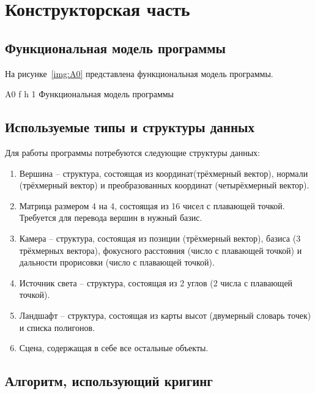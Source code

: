 \chapter{Конструкторская часть}

\section{Функциональная модель программы}

На рисунке~\ref{img:A0} представлена функциональная модель программы.

\FloatBarrier
{}
{A0} %
{f} %
{h} %
{1\textwidth} %
{Функциональная модель программы} %
\FloatBarrier

\section{Используемые типы и структуры данных}

Для работы программы потребуются следующие структуры данных:

\begin{enumerate}[label=\arabic*.]
	\item Вершина -- структура, состоящая из координат(трёхмерный вектор), нормали (трёхмерный вектор) и преобразованных координат (четырёхмерный вектор).
	\item Матрица размером 4 на 4, состоящая из 16 чисел с плавающей точкой. Требуется для перевода вершин в нужный базис.
	\item Камера -- структура, состоящая из позиции (трёхмерный вектор), базиса (3 трёхмерных вектора), фокусного расстояния (число с плавающей точкой) и дальности прорисовки (число с плавающей точкой).
	\item Источник света -- структура, состоящая из 2 углов (2 числа с плавающей точкой).
	\item Ландшафт -- структура, состоящая из карты высот (двумерный словарь точек) и списка полигонов.
	\item Сцена, содержащая в себе все остальные объекты.
\end{enumerate}

\section{Алгоритм, использующий кригинг}

